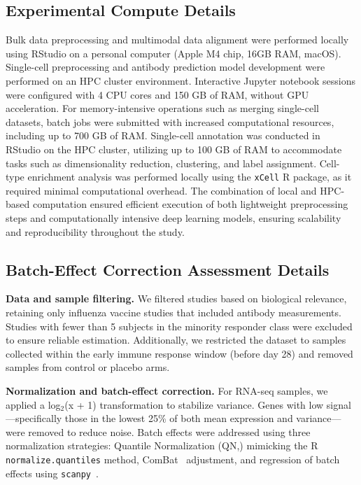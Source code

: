 \documentclass[
  12pt]{article}
\begin{document}
\subsection{Experimental Compute Details}
Bulk data preprocessing and multimodal data alignment were performed locally using RStudio on a personal computer (Apple M4 chip, 16GB RAM, macOS). Single-cell preprocessing and antibody prediction model development were performed on an HPC cluster environment. Interactive Jupyter notebook sessions were configured with 4 CPU cores and 150 GB of RAM, without GPU acceleration. For memory-intensive operations such as merging single-cell datasets, batch jobs were submitted with increased computational resources, including up to 700 GB of RAM. Single-cell annotation was conducted in RStudio on the HPC cluster, utilizing up to 100 GB of RAM to accommodate tasks such as dimensionality reduction, clustering, and label assignment. Cell-type enrichment analysis was performed locally using the \texttt{xCell} R package, as it required minimal computational overhead. The combination of local and HPC-based computation ensured efficient execution of both lightweight preprocessing steps and computationally intensive deep learning models, ensuring scalability and reproducibility throughout the study.

\subsection{Batch-Effect Correction Assessment Details}

\textbf{Data and sample filtering.} We filtered studies based on biological relevance, retaining only influenza vaccine studies that included antibody measurements. Studies with fewer than 5 subjects in the minority responder class were excluded to ensure reliable estimation. Additionally, we restricted the dataset to samples collected within the early immune response window (before day 28) and removed samples from control or placebo arms.

\textbf{Normalization and batch-effect correction.} For RNA-seq samples, we applied a log$_2$(x + 1) transformation to stabilize variance. Genes with low signal—specifically those in the lowest 25\% of both mean expression and variance—were removed to reduce noise. Batch effects were addressed using three normalization strategies: Quantile Normalization (QN,\citealp{bolstad2003comparison}) mimicking the R \texttt{normalize.quantiles} method, ComBat~\citep{johnson2007adjusting} adjustment, and regression of batch effects using \texttt{scanpy}~\citep{wolf2018scanpy}.
\end{document}
